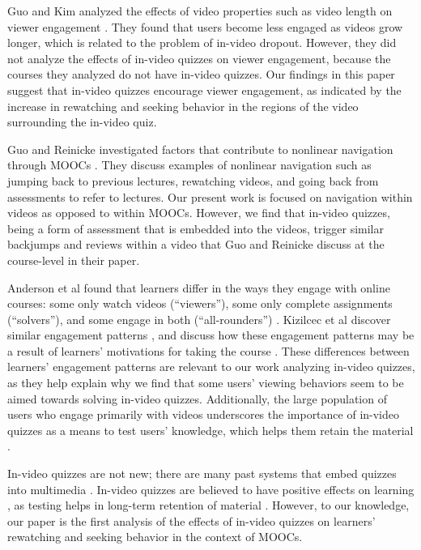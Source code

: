 \documentclass{sigchi}
\begin{document}
Guo and Kim analyzed the effects of video properties such as video length on viewer engagement \cite{guovideo}. They found that users become less engaged as videos grow longer, which is related to the problem of in-video dropout. However, they did not analyze the effects of in-video quizzes on viewer engagement, because the courses they analyzed do not have in-video quizzes. Our findings in this paper suggest that in-video quizzes encourage viewer engagement, as indicated by the increase in rewatching and seeking behavior in the regions of the video surrounding the in-video quiz.

Guo and Reinicke investigated factors that contribute to nonlinear navigation through MOOCs \cite{guodemographics}. They discuss examples of nonlinear navigation such as jumping back to previous lectures, rewatching videos, and going back from assessments to refer to lectures. Our present work is focused on navigation within videos as opposed to within MOOCs. However, we find that in-video quizzes, being a form of assessment that is embedded into the videos, trigger similar backjumps and reviews within a video that Guo and Reinicke discuss at the course-level in their paper.

Anderson et al found that learners differ in the ways they engage with online courses: some only watch videos (``viewers''), some only complete assignments (``solvers''), and some engage in both (``all-rounders'') \cite{ashton}. Kizilcec et al discover similar engagement patterns \cite{renedisengagement}, and discuss how these engagement patterns may be a result of learners' motivations for taking the course \cite{renemotivation}. These differences between learners' engagement patterns are relevant to our work analyzing in-video quizzes, as they help explain why we find that some users' viewing behaviors seem to be aimed towards solving in-video quizzes. Additionally, the large population of users who engage primarily with videos underscores the importance of in-video quizzes as a means to test users' knowledge, which helps them retain the material \cite{testingeffect}. %


In-video quizzes are not new; there are many past systems that embed quizzes into multimedia \cite{multimedia}. In-video quizzes are believed to have positive effects on learning \cite{embedded}, as testing helps in long-term retention of material \cite{testingeffect}. However, to our knowledge, our paper is the first analysis of the effects of in-video quizzes on learners' rewatching and seeking behavior in the context of MOOCs.
\end{document}
